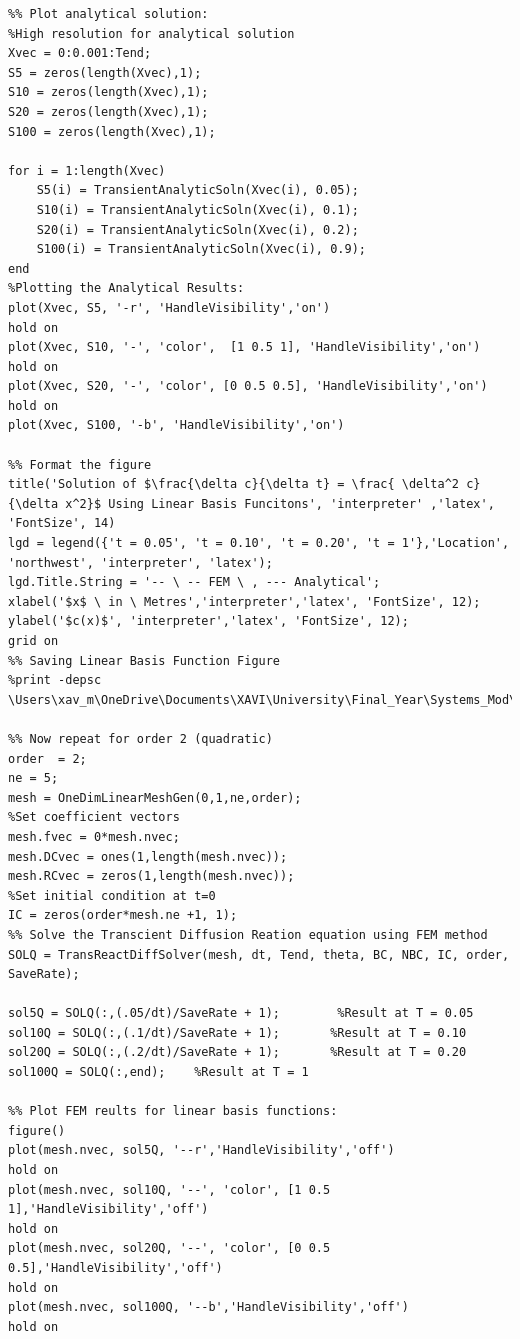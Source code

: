 \documentclass[11pt]{article}
\begin{document}
\begin{appendices}
\begin{lstlisting}
%% Plot analytical solution:
%High resolution for analytical solution
Xvec = 0:0.001:Tend;
S5 = zeros(length(Xvec),1);
S10 = zeros(length(Xvec),1);
S20 = zeros(length(Xvec),1);
S100 = zeros(length(Xvec),1);

for i = 1:length(Xvec)
    S5(i) = TransientAnalyticSoln(Xvec(i), 0.05);
    S10(i) = TransientAnalyticSoln(Xvec(i), 0.1);
    S20(i) = TransientAnalyticSoln(Xvec(i), 0.2);
    S100(i) = TransientAnalyticSoln(Xvec(i), 0.9);
end
%Plotting the Analytical Results:
plot(Xvec, S5, '-r', 'HandleVisibility','on')
hold on
plot(Xvec, S10, '-', 'color',  [1 0.5 1], 'HandleVisibility','on')
hold on
plot(Xvec, S20, '-', 'color', [0 0.5 0.5], 'HandleVisibility','on')
hold on
plot(Xvec, S100, '-b', 'HandleVisibility','on')

%% Format the figure
title('Solution of $\frac{\delta c}{\delta t} = \frac{ \delta^2 c}{\delta x^2}$ Using Linear Basis Funcitons', 'interpreter' ,'latex', 'FontSize', 14)
lgd = legend({'t = 0.05', 't = 0.10', 't = 0.20', 't = 1'},'Location', 'northwest', 'interpreter', 'latex');
lgd.Title.String = '-- \ -- FEM \ , --- Analytical';
xlabel('$x$ \ in \ Metres','interpreter','latex', 'FontSize', 12);
ylabel('$c(x)$', 'interpreter','latex', 'FontSize', 12);
grid on
%% Saving Linear Basis Function Figure
%print -depsc \Users\xav_m\OneDrive\Documents\XAVI\University\Final_Year\Systems_Mod\Modeling_CW2\Report\Figures\epsQ1a

%% Now repeat for order 2 (quadratic)
order  = 2;
ne = 5;
mesh = OneDimLinearMeshGen(0,1,ne,order);
%Set coefficient vectors
mesh.fvec = 0*mesh.nvec;
mesh.DCvec = ones(1,length(mesh.nvec));
mesh.RCvec = zeros(1,length(mesh.nvec));
%Set initial condition at t=0
IC = zeros(order*mesh.ne +1, 1);
%% Solve the Transcient Diffusion Reation equation using FEM method
SOLQ = TransReactDiffSolver(mesh, dt, Tend, theta, BC, NBC, IC, order, SaveRate);

sol5Q = SOLQ(:,(.05/dt)/SaveRate + 1);        %Result at T = 0.05
sol10Q = SOLQ(:,(.1/dt)/SaveRate + 1);       %Result at T = 0.10
sol20Q = SOLQ(:,(.2/dt)/SaveRate + 1);       %Result at T = 0.20
sol100Q = SOLQ(:,end);    %Result at T = 1

%% Plot FEM reults for linear basis functions:
figure()
plot(mesh.nvec, sol5Q, '--r','HandleVisibility','off')
hold on
plot(mesh.nvec, sol10Q, '--', 'color', [1 0.5 1],'HandleVisibility','off')
hold on
plot(mesh.nvec, sol20Q, '--', 'color', [0 0.5 0.5],'HandleVisibility','off')
hold on
plot(mesh.nvec, sol100Q, '--b','HandleVisibility','off')
hold on



\end{lstlisting}
\end{appendices}
\end{document}
